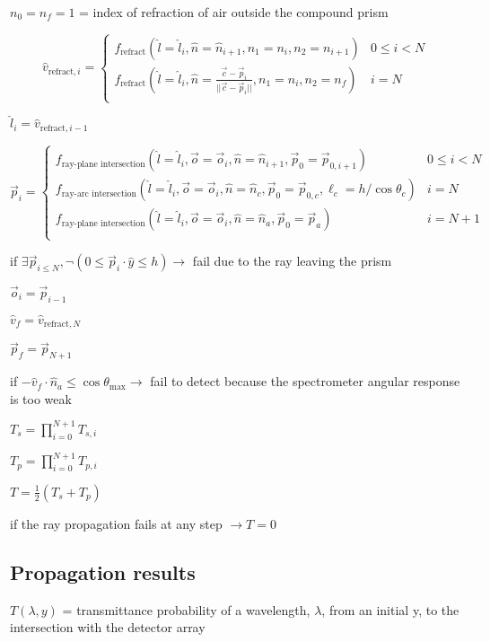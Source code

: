 \documentclass{article}
\begin{document}
$n_0 = n_f = 1$ = index of refraction of air outside the compound prism

\[\hat{v}_{\text{refract}, i} = \begin{cases}
		f_{\text{refract}}(\hat{l}=\hat{l}_i, \hat{n}=\hat{n}_{i+1}, n_1=n_i, n_2=n_{i+1})                                   & 0 \le i < N \\
		f_{\text{refract}}(\hat{l}=\hat{l}_i, \hat{n}=\frac{\vec{c} - \vec{p}_i}{||\vec{c} - \vec{p}_i||}, n_1=n_i, n_2=n_f) & i = N       \\
	\end{cases}\]

$\hat{l}_i = \hat{v}_{\text{refract}, i - 1}$

\[\vec{p}_i = \begin{cases}
		f_{\text{ray-plane intersection}}(\hat{l}=\hat{l}_i, \vec{o}=\vec{o}_i, \hat{n}=\hat{n}_{i+1}, \vec{p}_0=\vec{p}_{0, i+1})                    & 0 \le i < N \\
		f_{\text{ray-arc intersection}}(\hat{l}=\hat{l}_i, \vec{o}=\vec{o}_i, \hat{n}=\hat{n}_c, \vec{p}_0=\vec{p}_{0, c}, \ell_c=h/\cos{\theta_{c}}) & i = N       \\
		f_{\text{ray-plane intersection}}(\hat{l}=\hat{l}_i, \vec{o}=\vec{o}_i, \hat{n}=\hat{n}_{a}, \vec{p}_0=\vec{p}_a)                             & i = N + 1   \\
	\end{cases}\]

if $\exists \vec{p}_{i \le N}, \neg (0 \le \vec{p}_i \cdot \hat{y} \le h) \to$ fail due to the ray leaving the prism

$\vec{o}_i = \vec{p}_{i - 1}$

$\hat{v}_f = \hat{v}_{\text{refract}, N}$

$\vec{p}_f = \vec{p}_{N + 1}$

if $-\hat{v}_f \cdot \hat{n}_a \le \cos{\theta_{\text{max}}} \to$ fail to detect because the spectrometer angular response is too weak

$T_s = \prod_{i=0}^{N + 1} T_{s,i}$

$T_p = \prod_{i=0}^{N + 1} T_{p,i}$

$T = \frac{1}{2} (T_s + T_p)$

if the ray propagation fails at any step $\to T = 0$

\subsection{Propagation results}\label{subsec:propagation-results}
$T(\lambda, y)$ = transmittance probability of a wavelength, $\lambda$, from an initial y, to the intersection with the detector array
\end{document}
